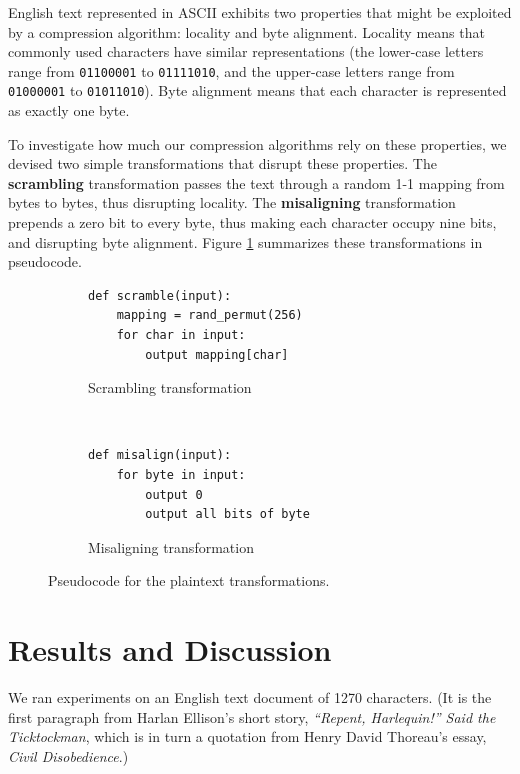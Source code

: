 \documentclass[11pt]{scrartcl}
\begin{document}
English text represented in ASCII exhibits two properties that might be
exploited by a compression algorithm: locality and byte alignment. Locality
means that commonly used characters have similar representations (the
lower-case letters range from {\tt 01100001} to {\tt 01111010}, and the
upper-case letters range from {\tt 01000001} to {\tt 01011010}). Byte alignment
means that each character is represented as exactly one byte.

To investigate how much our compression algorithms rely on these properties, we
devised two simple transformations that disrupt these properties. The {\bf
scrambling} transformation passes the text through a random 1-1 mapping from
bytes to bytes, thus disrupting locality. The {\bf misaligning} transformation
prepends a zero bit to every byte, thus making each character occupy nine bits,
and disrupting byte alignment. Figure \ref{fig:transformations} summarizes
these transformations in pseudocode.

\begin{figure}[h!]
    \centering
    \begin{subfigure}[b]{0.45\textwidth}
\begin{verbatim}
def scramble(input):
    mapping = rand_permut(256)
    for char in input:
        output mapping[char] \end{verbatim}
        \caption{Scrambling transformation}
    \end{subfigure}
    ~
    \begin{subfigure}[b]{0.45\textwidth}
\begin{verbatim}
def misalign(input):
    for byte in input:
        output 0
        output all bits of byte \end{verbatim}
        \caption{Misaligning transformation}
    \end{subfigure}
    \caption{Pseudocode for the plaintext transformations.}
    \label{fig:transformations}
\end{figure}



\section{Results and Discussion}

We ran experiments on an English text document of 1270 characters. (It is the
first paragraph from Harlan Ellison's short story, {\em ``Repent, Harlequin!''
Said the Ticktockman}, which is in turn a quotation from Henry David Thoreau's
essay, {\em Civil Disobedience}.)
\end{document}
